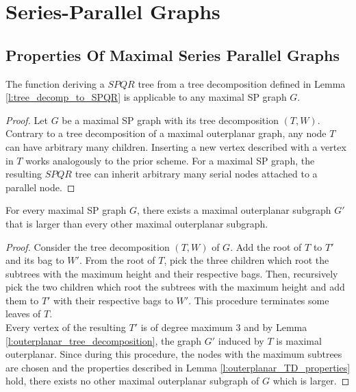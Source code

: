 \section{Series-Parallel Graphs}\label{section:SP-graphs}

\subsection{Properties Of Maximal Series Parallel Graphs}


\begin{lemma}
	The function deriving a $SPQR$ tree from a tree decomposition defined in Lemma \ref{l:tree_decomp_to_SPQR} is applicable to any maximal SP graph $G$.
\end{lemma}
\begin{proof}
	Let $G$ be a maximal SP graph with its tree decomposition $(T,W)$. Contrary to a tree decomposition of a maximal outerplanar graph, any node $T$ can have arbitrary many children. Inserting a new vertex described with a vertex in $T$ works analogously to the prior scheme. For a maximal SP graph, the resulting $SPQR$ tree can inherit arbitrary many serial nodes attached to a parallel node.
\end{proof}

\begin{lemma}
	For every maximal SP graph $G$, there exists a maximal outerplanar subgraph $G'$ that is larger than every other maximal outerplanar subgraph.
\end{lemma}
\begin{proof}
	Consider the tree decomposition $(T,W)$ of $G$. Add the root of $T$ to $T'$ and its bag to $W'$. From the root of $T$, pick the three children which root the subtrees with the maximum height and their respective bags. Then, recursively pick the two children which root the subtrees with the maximum height and add them to $T'$ with their respective bags to $W'$. This procedure terminates some leaves of $T$.\\
	Every vertex of the resulting $T'$ is of degree maximum 3 and by Lemma \ref{l:outerplanar_tree_decomposition}, the graph $G'$ induced by $T$ is maximal outerplanar. Since during this procedure, the nodes with the maximum subtrees are chosen and the properties described in Lemma \ref{l:outerplanar_TD_properties} hold, there exists no other maximal outerplanar subgraph of $G$ which is larger. 
\end{proof}

